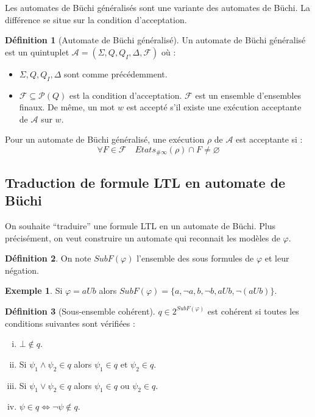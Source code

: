\documentclass[12pt,a4paper]{article}
\theoremstyle{plain}
\theoremstyle{definition}
\newtheorem{defi}{Définition}
\newtheorem{ex}{Exemple}
\begin{document}
Les automates de Büchi généralisés sont une variante des automates de Büchi.
La différence se situe sur la condition d'acceptation.
\begin{defi}[Automate de Büchi généralisé]
  Un automate de Büchi généralisé est un quintuplet $\mathcal{A}=(\Sigma, Q, Q_I, \Delta, \mathscr{F})$ où :
  \begin{itemize}
  \item $\Sigma, Q, Q_I, \Delta$ sont comme précédemment.
  \item $\mathscr{F} \subseteq \mathcal{P}(Q)$ est la condition d'acceptation.
    $\mathscr{F}$ est un ensemble d'ensembles finaux. De même, un mot $w$ est accepté s'il existe une exécution acceptante de $\mathcal{A}$ sur $w$.
  \end{itemize}
  
\end{defi}
Pour un automate de Büchi généralisé, une exécution $\rho$ de $\mathcal{A}$ est acceptante si :
\[
  \forall F \in \mathscr{F} \quad Etats_{\#\infty}(\rho) \cap F \neq \varnothing
\]

\subsection{Traduction de formule LTL en automate de Büchi}
On souhaite ``traduire'' une formule LTL en un automate de Büchi. Plus précisément, on veut construire un automate qui reconnait les modèles de $\varphi$.

\begin{defi}
  On note $SubF(\varphi)$ l'ensemble des sous formules de $\varphi$ et leur négation.
\end{defi}

\begin{ex}
  Si $\varphi = a U b$ alors $SubF(\varphi) = \{ a, \lnot a, b, \lnot b, a U b, \lnot(a U b)\}$.
\end{ex}

\begin{defi}[Sous-ensemble cohérent]
  $q \in 2^{SubF(\varphi)}$ est cohérent si toutes les conditions suivantes sont vérifiées :
  \begin{enumerate}[(i)]
  \item $\bot \not \in q$.
  \item Si $\psi_1 \land \psi_2 \in q$ alors $\psi_1 \in q$ et $\psi_2 \in q$.
  \item Si $\psi_1 \lor \psi_2 \in q$ alors $\psi_1 \in q$ ou $\psi_2 \in q$.
  \item $\psi \in q \iff \lnot \psi \not\in q$.
  \end{enumerate}
\end{defi}
\end{document}
